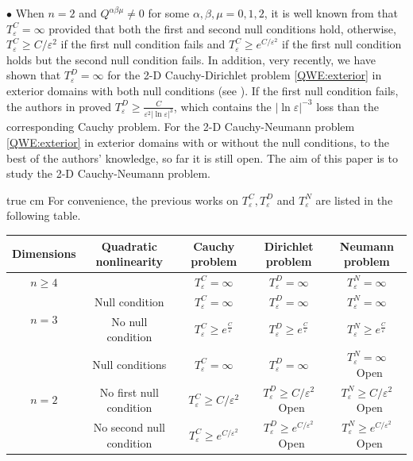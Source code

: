 \documentclass[11pt,twoside]{article}
\def\ds{\displaystyle}
\def\ve{\varepsilon}
\theoremstyle{plain}
\theoremstyle{definition}
\numberwithin{equation}{section}
\begin{document}
$\bullet$ When $n=2$ and $Q^{\alpha\beta\mu}\neq0$ for some $\alpha,\beta,\mu=0,1,2$, it is well known
from \cite{Alinhac99,Alinhac01a} that $T^C_{\ve}=\infty$ provided that both the first and second null
conditions hold, otherwise, $T^C_{\ve}\ge C/\ve^2$ if the first null condition fails
and $T^C_{\ve}\ge e^{C/\ve^2}$ if the first null condition holds but the second null condition fails.
In addition, very recently, we have shown that $T^D_{\ve}=\infty$ for the 2-D Cauchy-Dirichlet
problem \eqref{QWE:exterior} in exterior domains with both null conditions (see  \cite{HouYinYuan24}).
If the first null condition fails,
the authors in \cite{LRX25} proved $T^D_\ve\ge\frac{C}{\ve^2|\ln \ve|^3}$, which contains the $|\ln \ve|^{-3}$
loss than the
corresponding Cauchy problem.
For the 2-D Cauchy-Neumann problem \eqref{QWE:exterior} in exterior domains with or without the null conditions,
to the best of the authors' knowledge, so far it is still open.
The aim of this paper is to study the 2-D Cauchy-Neumann problem.

 true cm
For convenience, the previous works on $T_{\ve}^{C}, T_{\ve}^{D}$ and $T_{\ve}^{N}$ are listed in the following table.

\newpage

\begin{table}[!h]
\renewcommand\arraystretch{1.5}
\begin{tabular}{|c|c|c|c|c|}
\hline
Dimensions & Quadratic nonlinearity & Cauchy problem & Dirichlet problem& Neumann problem\\
\hline
$n\ge4$ &  & $\ds T_{\ve}^C=\infty$ & $\ds T_{\ve}^D=\infty$ &$\ds T_{\ve}^N=\infty$ \\
\hline
\multirow{2}{*}{$n=3$} & Null condition & $\ds T_{\ve}^C=\infty$ & $\ds T_{\ve}^D=\infty$&$\ds T_{\ve}^N=\infty$ \\
\cline{2-5}
 & No null condition & $\ds T_{\ve}^C\ge e^{\frac{C}{\ve}}$ & $\ds T_{\ve}^D\ge e^{\frac{C}{\ve}}$
 & $\ds T_{\ve}^N\ge e^{\frac{C}{\ve}}$
 \\
\hline
\multirow{3}{*}{$n=2$} & Null conditions & $\ds T_{\ve}^C=\infty$ & $\ds T_{\ve}^D=\infty$ &{\color{red}$\ds T_{\ve}^N=\infty$~Open} \\
\cline{2-5}
 & No first null condition & $\ds T_{\ve}^C\ge C/\ve^2$ & {\color{red}$\ds T_{\ve}^D\ge C/\ve^2$~Open}&
 {\color{red}$\ds T_{\ve}^N\ge C/\ve^2$~Open} \\
\cline{2-5}
 & No second null condition & $\ds T_{\ve}^C\ge e^{C/\ve^2}$ & {\color{red}$\ds T_{\ve}^D\ge e^{C/\ve^2}$~Open}&
 {\color{red}$\ds T_{\ve}^N\ge e^{C/\ve^2}$~Open} \\
\hline
\end{tabular}
\end{table}
\end{document}
